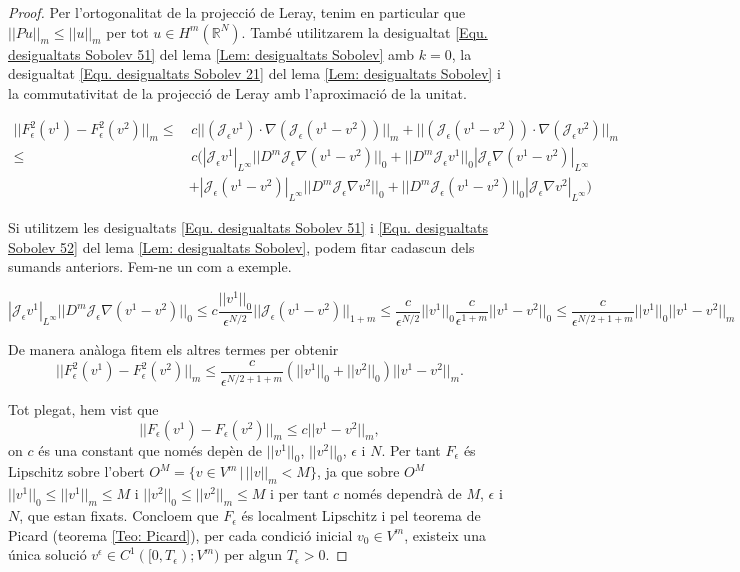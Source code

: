 \documentclass{article}
\numberwithin{equation}{section}
\begin{document}
\begin{proof}
Per l'ortogonalitat de la projecci\'{o} de Leray, tenim en particular que $||Pu||_m\leq||u||_m$ per tot $u\in H^m(\mathbb{R}^N)$. Tamb\'{e} utilitzarem la desigualtat \eqref{Equ. desigualtats Sobolev 51} del lema \ref{Lem: desigualtats Sobolev} amb $k=0$, la desigualtat \eqref{Equ. desigualtats Sobolev 21} del lema \ref{Lem: desigualtats Sobolev} i la commutativitat de la projecci\'{o} de Leray amb l'aproximaci\'{o} de la unitat.

\begin{align*}
||F_{\epsilon}^2(v^1)-F_{\epsilon}^2(v^2)||_m\leq&\,c||(\mathcal{J}_{\epsilon}v^1)\cdot\nabla(\mathcal{J}_{\epsilon}(v^1-v^2))||_m+||(\mathcal{J}_{\epsilon}(v^1-v^2))\cdot\nabla(\mathcal{J}_{\epsilon}v^2)||_m\\
\leq&\,c\Big(|\mathcal{J}_{\epsilon}v^1|_{L^{\infty}}||D^m\mathcal{J}_{\epsilon}\nabla(v^1-v^2)||_0+||D^m\mathcal{J}_{\epsilon}v^1||_0|\mathcal{J}_{\epsilon}\nabla(v^1-v^2)|_{L^{\infty}}\\
&+|\mathcal{J}_{\epsilon}(v^1-v^2)|_{L^{\infty}}||D^m\mathcal{J}_{\epsilon}\nabla v^2||_0+||D^m\mathcal{J}_{\epsilon}(v^1-v^2)||_0|\mathcal{J}_{\epsilon}\nabla v^2|_{L^{\infty}}\Big)
\end{align*}

Si utilitzem les desigualtats \eqref{Equ. desigualtats Sobolev 51} i \eqref{Equ. desigualtats Sobolev 52} del lema \ref{Lem: desigualtats Sobolev}, podem fitar cadascun dels sumands anteriors. Fem-ne un com a exemple.

\[|\mathcal{J}_{\epsilon}v^1|_{L^{\infty}}||D^m\mathcal{J}_{\epsilon}\nabla(v^1-v^2)||_0\leq c\frac{||v^1||_0}{\epsilon^{N/2}}||\mathcal{J}_{\epsilon}(v^1-v^2)||_{1+m}\leq\frac{c}{\epsilon^{N/2}}||v^1||_0\frac{c}{\epsilon^{1+m}}||v^1-v^2||_0\leq\frac{c}{\epsilon^{N/2+1+m}}||v^1||_0||v^1-v^2||_m\]

De manera an\`{a}loga fitem els altres termes per obtenir
\[||F_{\epsilon}^2(v^1)-F_{\epsilon}^2(v^2)||_m\leq\frac{c}{\epsilon^{N/2+1+m}}(||v^1||_0+||v^2||_0)||v^1-v^2||_m.\]

Tot plegat, hem vist que
\begin{equation}\label{Equ. F Lipschitz}
||F_{\epsilon}(v^1)-F_{\epsilon}(v^2)||_m\leq c||v^1-v^2||_m,
\end{equation}
on $c$ \'{e}s una constant que nom\'{e}s dep\`{e}n de $||v^1||_0$, $||v^2||_0$, $\epsilon$ i $N$. Per tant $F_{\epsilon}$ \'{e}s Lipschitz sobre l'obert $O^M=\{v\in V^m\,|\,||v||_m<M\}$, ja que sobre $O^M$ $||v^1||_0\leq||v^1||_m\leq M$ i $||v^2||_0\leq||v^2||_m\leq M$ i per tant $c$ nom\'{e}s dependr\`{a} de $M$, $\epsilon$ i $N$, que estan fixats. Concloem que $F_{\epsilon}$ \'{e}s localment Lipschitz i pel teorema de Picard (teorema \ref{Teo: Picard}), per cada condici\'{o} inicial $v_0\in V^m$, existeix una \'{u}nica soluci\'{o} $v^{\epsilon}\in C^1([0,T_{\epsilon});V^m)$ per algun $T_{\epsilon}>0$.
\end{proof}
\end{document}
